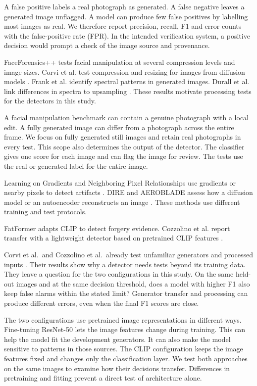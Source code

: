 \documentclass[11pt,a4paper]{article}
\begin{document}
A false positive labels a real photograph as generated. A false negative leaves a generated image unflagged. A model can produce few false positives by labelling most images as real. We therefore report precision, recall, F1 and error counts with the false-positive rate (FPR). In the intended verification system, a positive decision would prompt a check of the image source and provenance.

FaceForensics++ tests facial manipulation at several compression levels and image sizes. Corvi et al. test compression and resizing for images from diffusion models \cite{r3,r4}. Frank et al. identify spectral patterns in generated images. Durall et al. link differences in spectra to upsampling \cite{r5,r6}. These results motivate processing tests for the detectors in this study.

A facial manipulation benchmark can contain a genuine photograph with a local edit. A fully generated image can differ from a photograph across the entire frame. We focus on fully generated still images and retain real photographs in every test. This scope also determines the output of the detector. The classifier gives one score for each image and can flag the image for review. The tests use the real or generated label for the entire image.

Learning on Gradients and Neighboring Pixel Relationships use gradients or nearby pixels to detect artifacts \cite{r7,r8}. DIRE and AEROBLADE assess how a diffusion model or an autoencoder reconstructs an image \cite{r9,r10}. These methods use different training and test protocols.

FatFormer adapts CLIP to detect forgery evidence. Cozzolino et al. report transfer with a lightweight detector based on pretrained CLIP features \cite{r11,r12}.

Corvi et al.\ and Cozzolino et al.\ already test unfamiliar generators and processed inputs \cite{r4,r12}. Their results show why a detector needs tests beyond its training data. They leave a question for the two configurations in this study. On the same held-out images and at the same decision threshold, does a model with higher F1 also keep false alarms within the stated limit? Generator transfer and processing can produce different errors, even when the final F1 scores are close.

The two configurations use pretrained image representations in different ways. Fine-tuning ResNet-50 lets the image features change during training. This can help the model fit the development generators. It can also make the model sensitive to patterns in those sources. The CLIP configuration keeps the image features fixed and changes only the classification layer. We test both approaches on the same images to examine how their decisions transfer. Differences in pretraining and fitting prevent a direct test of architecture alone.
\end{document}
